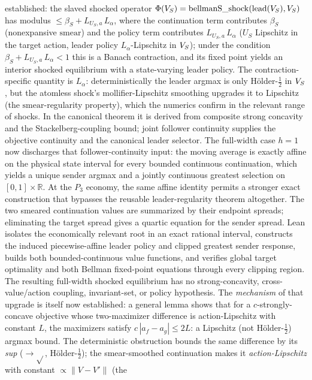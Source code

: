 established: the slaved shocked operator $\Phi(V_S)=\mathrm{bellmanS\_shock}
(\mathrm{lead}(V_S),V_S)$ has modulus $\le\beta_S+L_{U_S,a}\,L_\alpha$, where the
continuation term contributes $\beta_S$ (nonexpansive $\mathrm{smear}$) and
the policy term contributes $L_{U_S,a}\,L_\alpha$ ($U_S$ Lipschitz in the
target action, leader policy $L_\alpha$-Lipschitz in $V_S$); under the condition
$\beta_S+L_{U_S,a}\,L_\alpha<1$ this is a Banach contraction, and its fixed point
yields an interior shocked equilibrium with a state-varying leader policy. The
contraction-specific quantity is $L_\alpha$: deterministically the leader
argmax is only H\"older-$\tfrac12$ in $V_S$, but the atomless shock's
mollifier-Lipschitz smoothing upgrades it to Lipschitz (the
$\mathrm{smear}$-regularity property), which the numerics confirm in the
relevant range of shocks.  In the canonical theorem it is derived from composite
strong concavity and the Stackelberg-coupling bound; joint follower continuity
supplies the objective continuity and the canonical leader selector.
The full-width case $h=1$ now discharges that follower-continuity input: the moving
average is exactly affine on the physical state interval for every bounded
continuous continuation, which yields a unique sender argmax and a jointly
continuous greatest selection on $[0,1]\times\mathbb R$.
At the $P_3$ economy, the same affine identity permits a stronger exact
construction that bypasses the reusable leader-regularity theorem altogether.
The two smeared continuation values are summarized by their endpoint spreads;
eliminating the target spread gives a quartic equation for the sender spread.
Lean isolates the economically relevant root in an exact rational interval,
constructs the induced piecewise-affine leader policy and clipped greatest
sender response, builds both bounded-continuous value functions, and verifies
global target optimality and both Bellman fixed-point equations through every
clipping region. The resulting full-width shocked equilibrium has no
strong-concavity, cross-value/action coupling, invariant-set, or policy
hypothesis.
The \emph{mechanism} of that upgrade is itself now
established: a general lemma shows that for a $c$-strongly-concave objective
whose two-maximizer difference is action-Lipschitz with constant $L$, the
maximizers satisfy $c\,|a_f-a_g|\le 2L$: a Lipschitz (not Hölder-$\tfrac12$)
argmax bound. The
deterministic obstruction bounds the same difference by its \emph{sup}
($\to\sqrt{}$, Hölder-$\tfrac12$); the smear-smoothed continuation makes it
\emph{action-Lipschitz} with constant $\propto\|V-V'\|$ (the
